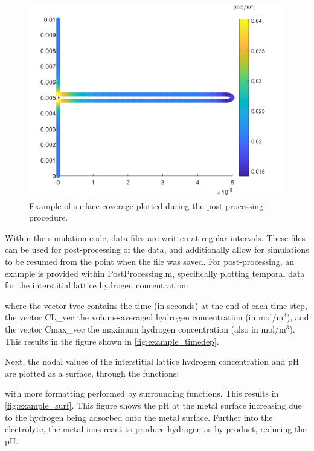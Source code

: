 \documentclass[3p]{elsarticle} %
\begin{document}
\begin{figure}
    \centering
    \includegraphics[width=12cm]{../Figures/SurfaceCoverage.jpg}
    \caption{Example of surface coverage plotted during the post-processing procedure.}
    \label{fig:example_coverage}
\end{figure}

Within the simulation code, data files are written at regular intervals. These files can be used for post-processing of the data, and additionally allow for simulations to be resumed from the point when the file was saved. For post-processing, an example is provided within PostProcessing.m, specifically plotting temporal data for the interstitial lattice hydrogen concentration:

where the vector tvec contains the time (in seconds) at the end of each time step, the vector CL{\_}vec the volume-averaged hydrogen concentration (in $\mathrm{mol}/\mathrm{m}^3$), and the vector Cmax{\_}vec the maximum hydrogen concentration (also in $\mathrm{mol}/\mathrm{m}^3$). This results in the figure shown in \cref{fig:example_timedep}.

Next, the nodal values of the interstitial lattice hydrogen concentration and pH are plotted as a surface, through the functions:


 with more formatting performed by surrounding functions. This results in \cref{fig:example_surf}. This figure shows the pH at the metal surface increasing due to the hydrogen being adsorbed onto the metal surface. Further into the electrolyte, the metal ions react to produce hydrogen as by-product, reducing the pH. 
 
\end{document}
